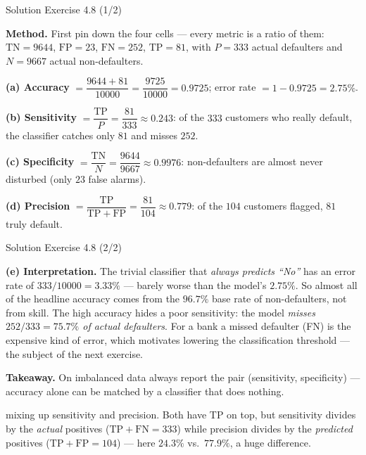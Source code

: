 \documentclass[aspectratio=169,11pt]{beamer}
\begin{document}
\begin{frame}{Solution \textemdash{} Exercise 4.8 (1/2)}
\begin{solutionbox}
\textbf{Method.} First pin down the four cells --- every metric is a
ratio of them:
$\mathrm{TN}=9644$, $\mathrm{FP}=23$, $\mathrm{FN}=252$,
$\mathrm{TP}=81$, with $P=333$ actual defaulters and $N=9667$ actual
non-defaulters.

\vspace{1mm}
\textbf{(a) Accuracy} $=\dfrac{9644+81}{10000}=\dfrac{9725}{10000}
=0.9725$; error rate $=1-0.9725=2.75\%$.

\textbf{(b) Sensitivity} $=\dfrac{\mathrm{TP}}{P}=\dfrac{81}{333}
\approx 0.243$: of the $333$ customers who really default, the
classifier catches only $81$ and misses $252$.

\textbf{(c) Specificity} $=\dfrac{\mathrm{TN}}{N}=\dfrac{9644}{9667}
\approx 0.9976$: non-defaulters are almost never disturbed (only $23$
false alarms).

\textbf{(d) Precision} $=\dfrac{\mathrm{TP}}{\mathrm{TP+FP}}
=\dfrac{81}{104}\approx 0.779$: of the $104$ customers flagged, $81$
truly default.
\end{solutionbox}
\end{frame}

\begin{frame}{Solution \textemdash{} Exercise 4.8 (2/2)}
\begin{solutionbox}
\textbf{(e) Interpretation.}
The trivial classifier that \emph{always predicts ``No''} has an error
rate of $333/10000=3.33\%$ --- barely worse than the model's $2.75\%$. So
almost all of the headline accuracy comes from the $96.7\%$ base rate
of non-defaulters, not from skill. The
high accuracy hides a poor sensitivity: the model \emph{misses
$252/333=75.7\%$ of actual defaulters}. For a bank a missed defaulter
(FN) is the expensive kind of error,
which motivates lowering the classification threshold --- the subject
of the next exercise.

\vspace{1mm}
\textbf{Takeaway.} On imbalanced data always report the pair
(sensitivity, specificity) --- accuracy alone can be matched by a
classifier that does nothing.
\end{solutionbox}
\begin{mistake}
mixing up sensitivity and precision. Both have
TP on top, but sensitivity divides by the \emph{actual} positives
($\mathrm{TP+FN}=333$) while precision divides by the \emph{predicted}
positives ($\mathrm{TP+FP}=104$) --- here $24.3\%$ vs.\ $77.9\%$, a
huge difference.
\end{mistake}
\end{frame}
\end{document}
